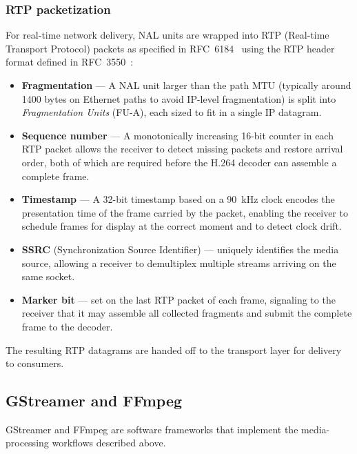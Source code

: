 \subsubsection{\ac{RTP} packetization}
\label{sec:rtp_packetization}
For real-time network delivery, NAL units are wrapped into \ac{RTP} (Real-time Transport Protocol) packets as specified in RFC~6184~\cite{jesup_rtp_2011} using the \ac{RTP} header format defined in RFC~3550~\cite{schulzrinne_rtp_2003}:
\begin{itemize}
    \item \textbf{Fragmentation} --- A NAL unit larger than the path \ac{MTU} (typically around 1400 bytes on Ethernet paths to avoid IP-level fragmentation) is split into \textit{Fragmentation Units} (FU-A), each sized to fit in a single IP datagram.~\cite{jesup_rtp_2011}
    \item \textbf{Sequence number} --- A monotonically increasing 16-bit counter in each \ac{RTP} packet allows the receiver to detect missing packets and restore arrival order, both of which are required before the H.264 decoder can assemble a complete frame.~\cite{schulzrinne_rtp_2003}
    \item \textbf{Timestamp} --- A 32-bit timestamp based on a 90~kHz clock encodes the presentation time of the frame carried by the packet, enabling the receiver to schedule frames for display at the correct moment and to detect clock drift.~\cite{jesup_rtp_2011,schulzrinne_rtp_2003}
    \item \textbf{SSRC} (Synchronization Source Identifier) --- uniquely identifies the media source, allowing a receiver to demultiplex multiple streams arriving on the same socket.~\cite{schulzrinne_rtp_2003}
    \item \textbf{Marker bit} --- set on the last \ac{RTP} packet of each frame, signaling to the receiver that it may assemble all collected fragments and submit the complete frame to the decoder.~\cite{jesup_rtp_2011,schulzrinne_rtp_2003}
\end{itemize}
The resulting \ac{RTP} datagrams are handed off to the transport layer for delivery to consumers.

\subsection{GStreamer and FFmpeg}
\label{sec:gstreamer_ffmpeg_theory}
GStreamer and FFmpeg are software frameworks that implement the media-processing workflows described above.~\cite{gstreamerTutorials2026,ffmpegDocumentation2026}

